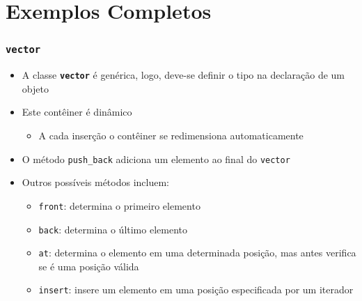 \documentclass[xcolor={dvipsnames,table},aspectratio=169]{beamer}
\begin{document}
\section{Exemplos Completos}

\begin{frame}\frametitle{\texttt{vector}}
\begin{itemize}
	\item A classe \textbf{\texttt{vector}} é genérica, logo, deve-se definir o tipo na declaração de um objeto
	\item Este contêiner é dinâmico
	\begin{itemize}
		\item A cada inserção o contêiner se redimensiona automaticamente
	\end{itemize}
	\item O método \texttt{push\_back} adiciona um elemento ao final do \texttt{vector}
	\item Outros possíveis métodos incluem:
	\begin{itemize}
		\item \texttt{front}: determina o primeiro elemento
		\item \texttt{back}: determina o último elemento
		\item \texttt{at}: determina o elemento em uma determinada posição, mas antes verifica se é uma posição válida
		\item \texttt{insert}: insere um elemento em uma posição especificada por um iterador
	\end{itemize}
\end{itemize}
\end{frame}
\end{document}

